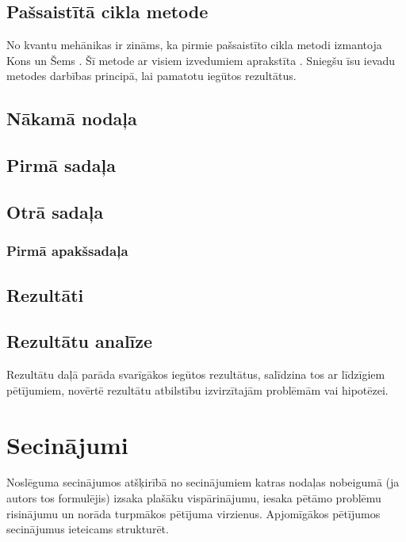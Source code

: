 \documentclass[12pt]{report}%
\theoremstyle{definition}
\begin{document}
\section{Pašsaistītā cikla metode}
No kvantu mehānikas ir zināms, ka pirmie pašsaistīto cikla metodi izmantoja Kons un Šems \cite{PhysRev.140.A1133}. Šī metode ar visiem izvedumiem aprakstīta \cite{dirac}. Sniegšu īsu ievadu metodes darbības principā, lai pamatotu iegūtos rezultātus.


\begin{center}
    \chapter{Nākamā nodaļa}
\end{center}
\section{Pirmā sadaļa}

\section{Otrā sadaļa}
\subsection{Pirmā apakšsadaļa}




\begin{center}
    \chapter{Rezultāti}
   
\end{center}
\section{Rezultātu analīze}
Rezultātu daļā parāda svarīgākos iegūtos rezultātus, salīdzina tos ar līdzīgiem
pētījumiem, novērtē rezultātu atbilstību izvirzītajām problēmām vai hipotēzei. 
\chapter*{Secinājumi}
Noslēguma secinājumos atšķirībā no secinājumiem katras nodaļas nobeigumā (ja
autors tos formulējis) izsaka plašāku vispārinājumu, iesaka pētāmo problēmu risinājumu un
norāda turpmākos pētījuma virzienus. Apjomīgākos pētījumos secinājumus ieteicams strukturēt.
\end{document}
